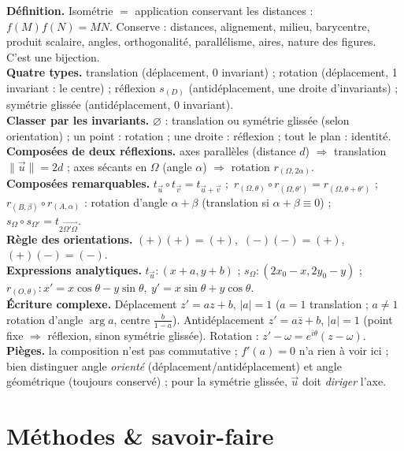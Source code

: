 \begin{synthese}
\textbf{Définition.} Isométrie $=$ application conservant les distances : $f(M)f(N)=MN$. Conserve : distances, alignement, milieu, barycentre, produit scalaire, angles, orthogonalité, parallélisme, aires, nature des figures. C'est une bijection.\\[4pt]
\textbf{Quatre types.}
translation (déplacement, 0 invariant) ; rotation (déplacement, 1 invariant : le centre) ; réflexion $s_{(D)}$ (antidéplacement, une droite d'invariants) ; symétrie glissée (antidéplacement, 0 invariant).\\[4pt]
\textbf{Classer par les invariants.} $\varnothing$ : translation ou symétrie glissée (selon orientation) ; un point : rotation ; une droite : réflexion ; tout le plan : identité.\\[4pt]
\textbf{Composées de deux réflexions.} axes parallèles (distance $d$) $\Rightarrow$ translation $\|\vec u\|=2d$ ; axes sécants en $\Omega$ (angle $\alpha$) $\Rightarrow$ rotation $r_{(\Omega,2\alpha)}$.\\[4pt]
\textbf{Composées remarquables.} $t_{\vec u}\circ t_{\vec v}=t_{\vec u+\vec v}$ ;\ $r_{(\Omega,\theta)}\circ r_{(\Omega,\theta')}=r_{(\Omega,\theta+\theta')}$ ;\ $r_{(B,\beta)}\circ r_{(A,\alpha)}$ : rotation d'angle $\alpha+\beta$ (translation si $\alpha+\beta\equiv0$) ;\ $s_\Omega\circ s_{\Omega'}=t_{2\overrightarrow{\Omega'\Omega}}$.\\[4pt]
\textbf{Règle des orientations.} $(+)(+)=(+)$,\ $(-)(-)=(+)$,\ $(+)(-)=(-)$.\\[4pt]
\textbf{Expressions analytiques.} $t_{\vec u}:(x{+}a,y{+}b)$ ; $s_\Omega:(2x_0{-}x,2y_0{-}y)$ ; $r_{(O,\theta)}:x'=x\cos\theta-y\sin\theta,\ y'=x\sin\theta+y\cos\theta$.\\[4pt]
\textbf{Écriture complexe.} Déplacement $z'=az+b$, $|a|=1$ ($a=1$ translation ; $a\neq1$ rotation d'angle $\arg a$, centre $\frac b{1-a}$). Antidéplacement $z'=a\overline z+b$, $|a|=1$ (point fixe $\Rightarrow$ réflexion, sinon symétrie glissée). Rotation : $z'-\omega=e^{i\theta}(z-\omega)$.\\[4pt]
\textbf{Pièges.} la composition n'est pas commutative ; $f'(a)=0$ n'a rien à voir ici ; bien distinguer angle \emph{orienté} (déplacement/antidéplacement) et angle géométrique (toujours conservé) ; pour la symétrie glissée, $\vec u$ doit \emph{diriger} l'axe.
\end{synthese}

\section{Méthodes \& savoir-faire}

